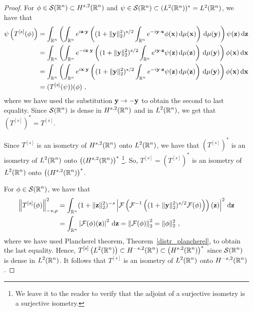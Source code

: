 \begin{proof}
For $\displaystyle \phi \in \mathcal{S}(\mathbb{R}^n) \subset H^{s,2}(\mathbb{R}^n)$ and
$\psi \in \mathcal{S}(\mathbb{R}^n) \subset (L^2(\mathbb{R}^n))^\ast = L^2(\mathbb{R}^n)$, we have that
\begin{align*}
\psi\left(T^{[s]}(\phi)\right)
&= \int_{\mathbb{R}^n}  \left( \int_{\mathbb{R}^n} e^{i\mathbf{z}\cdot \mathbf{y}} \left(
(1+\|\mathbf{y}\|_2^2)^{s/2} \int_{\mathbb{R}^n} e^{-i \mathbf{y}\cdot\mathbf{x}}
\phi(\mathbf{x}) \,\mathrm{d}{\mu(\mathbf{x})} \right) \,\mathrm{d}{\mu(\mathbf{y})} \right)
\psi(\mathbf{z}) \,\mathrm{d}{\mathbf{z}} \\
&= \int_{\mathbb{R}^n}  \left( \int_{\mathbb{R}^n} e^{-i\mathbf{x}\cdot \mathbf{y}} \left(
(1+\|\mathbf{y}\|_2^2)^{s/2} \int_{\mathbb{R}^n} e^{i \mathbf{y}\cdot\mathbf{z}}
\psi(\mathbf{z}) \,\mathrm{d}{\mu(\mathbf{z})} \right) \,\mathrm{d}{\mu(\mathbf{y})} \right)
\phi(\mathbf{x}) \,\mathrm{d}{\mathbf{x}} \\
&= \int_{\mathbb{R}^n}  \left( \int_{\mathbb{R}^n} e^{i\mathbf{x}\cdot \mathbf{y}} \left(
(1+\|\mathbf{y}\|_2^2)^{s/2} \int_{\mathbb{R}^n} e^{-i \mathbf{y}\cdot\mathbf{z}}
\psi(\mathbf{z}) \,\mathrm{d}{\mu(\mathbf{z})} \right) \,\mathrm{d}{\mu(\mathbf{y})} \right)
\phi(\mathbf{x}) \,\mathrm{d}{\mathbf{x}} \\
&= (T^{[s]}(\psi))(\phi) \ ,
\end{align*}
where we have used the substitution $\mathbf{y} \to -\mathbf{y}$ to obtain
the second to last equality.
Since $\displaystyle \mathcal{S}(\mathbb{R}^n)$ is dense in $\displaystyle H^{s,2}(\mathbb{R}^n)$ and
in $\displaystyle L^2(\mathbb{R}^n)$, we get that 
$\displaystyle (T^{[s]})^\ast = T^{[s]}$.

Since $\displaystyle T^{[s]}$ is an isometry of $\displaystyle H^{s,2}(\mathbb{R}^n)$
onto $\displaystyle L^2(\mathbb{R}^n)$, we have that
$\displaystyle (T^{[s]})^\ast$ is an isometry of 
$\displaystyle L^2(\mathbb{R}^n)$ onto
$\displaystyle \big((H^{s,2}(\mathbb{R}^n)\big)^\ast$
\footnote{We leave it to the reader to verify that the adjoint of a
surjective isometry is a surjective isometry.}.  So,
$\displaystyle T^{[s]} = (T^{[s]})^\ast$ is an isometry of 
$\displaystyle L^2(\mathbb{R}^n)$ onto $\displaystyle \big((H^{s,2}(\mathbb{R}^n)\big)^\ast$.

For $\displaystyle \phi \in \mathcal{S}(\mathbb{R}^n)$, we have that
\begin{align*}
\left\| T^{[s]}(\phi)\right\|_{-s,\rho}^2
&= \int_{\mathbb{R}^n} (1+\|\mathbf{z}\|_2^2)^{-s}
\left| \mathcal{F}\left( \mathcal{F}^{-1}\left( (1+\|\mathbf{y}\|_2^2)^{s/2} \mathcal{F}(\phi)\right)\right)(\mathbf{z})
\right|^2 \,\mathrm{d}{\mathbf{z}} \\
&= \int_{\mathbb{R}^n} \left| \mathcal{F}(\phi) (\mathbf{z}) \right|^2 \,\mathrm{d}{\mathbf{z}}
= \left\| \mathcal{F}(\phi) \right\|_2^2 = \|\phi\|_2^2 \ ,
\end{align*}
where we have used Plancherel theorem,
Theorem~\ref{distr_plancherel}, to obtain the last equality.
Hence, $\displaystyle T^{[s]}\left(L^2(\mathbb{R}^n)\right) \subset H^{-s,2}(\mathbb{R}^n)
\subset \big(H^{s,2}(\mathbb{R}^n)\big)^\ast$ since $\displaystyle
\mathcal{S}(\mathbb{R}^n)$ is dense in $\displaystyle L^2(\mathbb{R}^n)$.  It follows that
$\displaystyle T^{[s]}$ is an isometry of 
$\displaystyle L^2(\mathbb{R}^n)$ onto $\displaystyle H^{-s,2}(\mathbb{R}^n)$.


\end{proof}
